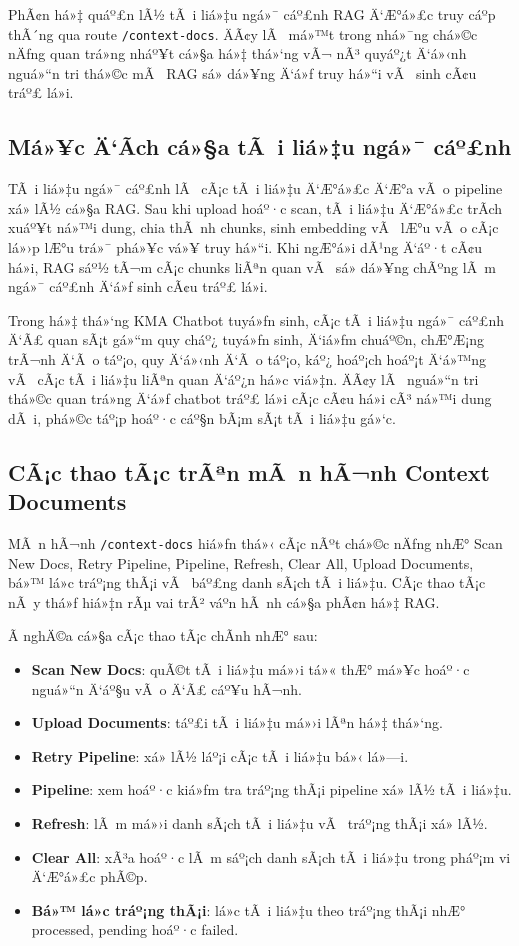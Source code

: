 ﻿\documentclass[12pt,a4paper]{report}
\begin{document}
PhÃ¢n há»‡ quáº£n lÃ½ tÃ i liá»‡u ngá»¯ cáº£nh RAG Ä‘Æ°á»£c truy cáº­p thÃ´ng qua route \texttt{/context-docs}. ÄÃ¢y lÃ  má»™t trong nhá»¯ng chá»©c nÄƒng quan trá»ng nháº¥t cá»§a há»‡ thá»‘ng vÃ¬ nÃ³ quyáº¿t Ä‘á»‹nh nguá»“n tri thá»©c mÃ  RAG sá»­ dá»¥ng Ä‘á»ƒ truy há»“i vÃ  sinh cÃ¢u tráº£ lá»i.

\subsection{Má»¥c Ä‘Ã­ch cá»§a tÃ i liá»‡u ngá»¯ cáº£nh}

TÃ i liá»‡u ngá»¯ cáº£nh lÃ  cÃ¡c tÃ i liá»‡u Ä‘Æ°á»£c Ä‘Æ°a vÃ o pipeline xá»­ lÃ½ cá»§a RAG. Sau khi upload hoáº·c scan, tÃ i liá»‡u Ä‘Æ°á»£c trÃ­ch xuáº¥t ná»™i dung, chia thÃ nh chunks, sinh embedding vÃ  lÆ°u vÃ o cÃ¡c lá»›p lÆ°u trá»¯ phá»¥c vá»¥ truy há»“i. Khi ngÆ°á»i dÃ¹ng Ä‘áº·t cÃ¢u há»i, RAG sáº½ tÃ¬m cÃ¡c chunks liÃªn quan vÃ  sá»­ dá»¥ng chÃºng lÃ m ngá»¯ cáº£nh Ä‘á»ƒ sinh cÃ¢u tráº£ lá»i.

Trong há»‡ thá»‘ng KMA Chatbot tuyá»ƒn sinh, cÃ¡c tÃ i liá»‡u ngá»¯ cáº£nh Ä‘Ã£ quan sÃ¡t gá»“m quy cháº¿ tuyá»ƒn sinh, Ä‘iá»ƒm chuáº©n, chÆ°Æ¡ng trÃ¬nh Ä‘Ã o táº¡o, quy Ä‘á»‹nh Ä‘Ã o táº¡o, káº¿ hoáº¡ch hoáº¡t Ä‘á»™ng vÃ  cÃ¡c tÃ i liá»‡u liÃªn quan Ä‘áº¿n há»c viá»‡n. ÄÃ¢y lÃ  nguá»“n tri thá»©c quan trá»ng Ä‘á»ƒ chatbot tráº£ lá»i cÃ¡c cÃ¢u há»i cÃ³ ná»™i dung dÃ i, phá»©c táº¡p hoáº·c cáº§n bÃ¡m sÃ¡t tÃ i liá»‡u gá»‘c.

\subsection{CÃ¡c thao tÃ¡c trÃªn mÃ n hÃ¬nh Context Documents}

MÃ n hÃ¬nh \texttt{/context-docs} hiá»ƒn thá»‹ cÃ¡c nÃºt chá»©c nÄƒng nhÆ° Scan New Docs, Retry Pipeline, Pipeline, Refresh, Clear All, Upload Documents, bá»™ lá»c tráº¡ng thÃ¡i vÃ  báº£ng danh sÃ¡ch tÃ i liá»‡u. CÃ¡c thao tÃ¡c nÃ y thá»ƒ hiá»‡n rÃµ vai trÃ² váº­n hÃ nh cá»§a phÃ¢n há»‡ RAG.

Ã nghÄ©a cá»§a cÃ¡c thao tÃ¡c chÃ­nh nhÆ° sau:

\begin{itemize}
    \item \textbf{Scan New Docs}: quÃ©t tÃ i liá»‡u má»›i tá»« thÆ° má»¥c hoáº·c nguá»“n Ä‘áº§u vÃ o Ä‘Ã£ cáº¥u hÃ¬nh.
    \item \textbf{Upload Documents}: táº£i tÃ i liá»‡u má»›i lÃªn há»‡ thá»‘ng.
    \item \textbf{Retry Pipeline}: xá»­ lÃ½ láº¡i cÃ¡c tÃ i liá»‡u bá»‹ lá»—i.
    \item \textbf{Pipeline}: xem hoáº·c kiá»ƒm tra tráº¡ng thÃ¡i pipeline xá»­ lÃ½ tÃ i liá»‡u.
    \item \textbf{Refresh}: lÃ m má»›i danh sÃ¡ch tÃ i liá»‡u vÃ  tráº¡ng thÃ¡i xá»­ lÃ½.
    \item \textbf{Clear All}: xÃ³a hoáº·c lÃ m sáº¡ch danh sÃ¡ch tÃ i liá»‡u trong pháº¡m vi Ä‘Æ°á»£c phÃ©p.
    \item \textbf{Bá»™ lá»c tráº¡ng thÃ¡i}: lá»c tÃ i liá»‡u theo tráº¡ng thÃ¡i nhÆ° processed, pending hoáº·c failed.
\end{itemize}
\end{document}
